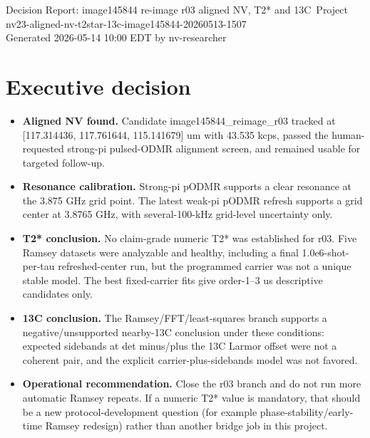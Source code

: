 \documentclass[10pt]{article}
\newcommand{\claim}[1]{\textbf{#1}}
\begin{document}
\begin{center}
{\Large Decision Report: image145844 re-image r03 aligned NV, T2* and 13C}\
{\small Project nv23-aligned-nv-t2star-13c-image145844-20260513-1507}\\
Generated 2026-05-14 10:00 EDT by nv-researcher
\end{center}

\section*{Executive decision}
\begin{itemize}
\item \claim{Aligned NV found.} Candidate image145844\_reimage\_r03 tracked at [117.314436, 117.761644, 115.141679] um with 43.535 kcps, passed the human-requested strong-pi pulsed-ODMR alignment screen, and remained usable for targeted follow-up.
\item \claim{Resonance calibration.} Strong-pi pODMR supports a clear resonance at the 3.875 GHz grid point. The latest weak-pi pODMR refresh supports a grid center at 3.8765 GHz, with several-100-kHz grid-level uncertainty only.
\item \claim{T2* conclusion.} No claim-grade numeric T2* was established for r03. Five Ramsey datasets were analyzable and healthy, including a final 1.0e6-shot-per-tau refreshed-center run, but the programmed carrier was not a unique stable model. The best fixed-carrier fits give order-1--3 us descriptive candidates only.
\item \claim{13C conclusion.} The Ramsey/FFT/least-squares branch supports a negative/unsupported nearby-13C conclusion under these conditions: expected sidebands at det minus/plus the 13C Larmor offset were not a coherent pair, and the explicit carrier-plus-sidebands model was not favored.
\item \claim{Operational recommendation.} Close the r03 branch and do not run more automatic Ramsey repeats. If a numeric T2* value is mandatory, that should be a new protocol-development question (for example phase-stability/early-time Ramsey redesign) rather than another bridge job in this project.
\end{itemize}
\end{document}
